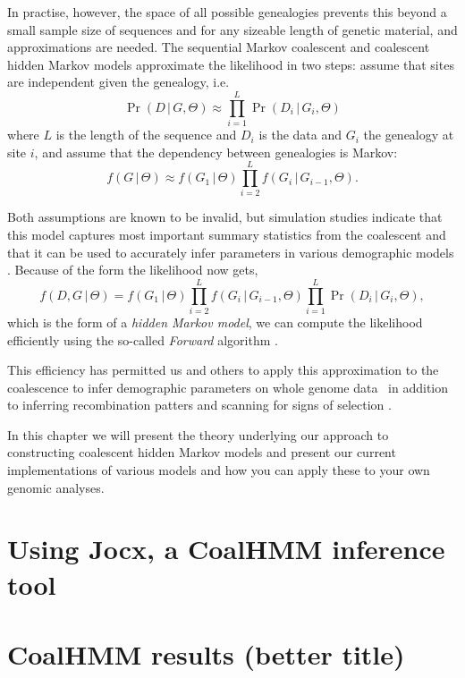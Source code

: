 \documentclass[graybox]{svmult}
\begin{document}
In practise, however, the space of all possible genealogies prevents this beyond a small sample size of sequences and for any sizeable length of genetic material, and approximations are needed. The sequential Markov coalescent and coalescent hidden Markov models approximate the likelihood in two steps: assume that sites are independent given the genealogy, i.e.
\begin{equation}
  \Pr(D\,|\,G,\Theta) \approx
  \prod_{i=1}^L \Pr(D_i\,|\,G_i,\Theta)
\end{equation}
where $L$ is the length of the sequence and $D_i$ is the data and $G_i$ the genealogy at site $i$, and assume that the dependency between genealogies is Markov:
\begin{equation}
  \label{eq:markov-genealogy}
  f(G\,|\,\Theta) \approx
  f(G_1\,|\,\Theta)\prod_{i=2}^{L}f(G_{i}\,|\,G_{i-1},\Theta)
  .
\end{equation}

Both assumptions are known to be invalid, but simulation studies indicate that this model captures most important summary statistics from the coalescent \cite{McVean:2005hoa,Marjoram:2006hpa} and that it can be used to accurately infer parameters in various demographic models \cite{Mailund:2011dva,Mailund:2012ewa,Cheng:2015kia}. Because of the form the likelihood now gets,
\begin{equation}
  \label{eq:coalhmm-joint-probability}
  f(D,G\,|\,\Theta) = 
  	f(G_1\,|\,\Theta)
  	\prod_{i=2}^{L}f(G_{i}\,|\,G_{i-1},\Theta)
  	\prod_{i=1}^L \Pr(D_i\,|\,G_i,\Theta)
  	,
\end{equation}
which is the form of a \emph{hidden Markov model}, we can compute the likelihood efficiently using the so-called \emph{Forward} algorithm \cite[chapter 3]{durbin1998biological}.


This efficiency has permitted us and others to apply this approximation to the coalescence to infer demographic parameters on whole genome data~\cite{Li:2011eza,Locke:2011gna, Hobolth:2011dia, Scally:2012ika, Prufer:2012ea, Miller:2012cxa, Abascal:2016cy, PradoMartinez:2013dna, Jonsson:2014fga} in addition to inferring recombination patters \cite{Munch:2014cba,Munch:2014cwa} and scanning for signs of selection \cite{Dutheil:2015kl,Munch:2016dn}.





In this chapter we will present the theory underlying our approach to constructing coalescent hidden Markov models and present our current implementations of various models and how you can apply these to your own genomic analyses.



\section{Using Jocx, a CoalHMM inference tool}

\section{CoalHMM results (better title)}




\end{document}
